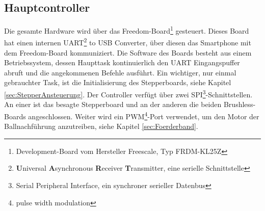     \subsection{Hauptcontroller}    	
        Die gesamte Hardware wird über das Freedom-Board\footnote{Development-Board vom 
        Hersteller Freescale, Typ FRDM-KL25Z} gesteuert. Dieses Board hat einen internen UART\footnote{\textbf{U}niversal \textbf{A}synchronous \textbf{R}eceiver 
        \textbf{T}ransmitter, eine serielle Schnittstelle} to USB Converter, über diesen 
        das Smartphone mit dem Freedom-Board kommuniziert. Die Software des Boards besteht aus einem 
        Betriebssystem, dessen Haupttask kontinuierlich den UART Eingangspuffer abruft 
        und die angekommenen Befehle ausführt. Ein wichtiger, nur einmal gebrauchter Task, 
        ist die Initialisierung des Stepperboards, siehe Kapitel \ref{sec:StepperAnsteuerung}. Der Controller 
        verfügt über zwei SPI\footnote{Serial Peripheral Interface, ein synchroner serieller Datenbus }-Schnittstellen. An einer ist das besagte Stepperboard und 
        an der anderen die beiden Brushless-Boards angeschlossen. Weiter wird ein PWM\footnote{pulse width modulation}-Port 
        verwendet, um den Motor der Ballnachführung anzutreiben, siehe Kapitel 
        \ref{sec:Foerderband}.  

   
